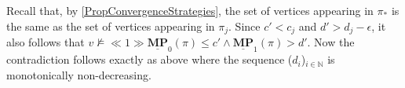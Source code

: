 Recall that, by \cref{PropConvergenceStrategies}, the set of vertices appearing in $\pi_*$ is the same as the set of vertices appearing in $\pi_j$.
Since $c' < c_j$ and $d' > d_j-\epsilon$, it also follows that $v \not \models \ll 1 \gg \underline{\mathbf{MP}}_0(\pi) \leqslant c' \land \underline{\mathbf{MP}}_1(\pi) > d'$.
Now the contradiction follows exactly as above where the sequence ($d_i$)$_{i \in \mathbb{N}}$ is monotonically non-decreasing.